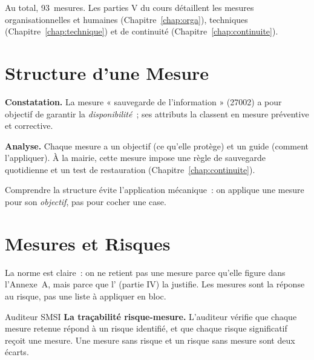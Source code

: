 Au total, 93~mesures. Les parties V du cours détaillent les mesures
organisationnelles et humaines (Chapitre~\ref{chap:orga}), techniques
(Chapitre~\ref{chap:technique}) et de continuité (Chapitre~\ref{chap:continuite}).

\section{Structure d'une Mesure}
\label{sec:c10-structure}

\begin{boxprocedure}
\textbf{Constatation.} La mesure « sauvegarde de l'information » (27002) a pour
objectif de garantir la \emph{disponibilité}~; ses attributs la classent en
mesure préventive et corrective.

\medskip
\textbf{Analyse.} Chaque mesure a un objectif (ce qu'elle protège) et un guide
(comment l'appliquer). À la mairie, cette mesure impose une règle de
sauvegarde quotidienne et un test de restauration (Chapitre~\ref{chap:continuite}).
\end{boxprocedure}

Comprendre la structure évite l'application mécanique~: on applique une mesure
pour son \emph{objectif}, pas pour cocher une case.

\section{Mesures et Risques}
\label{sec:c10-risques}

La norme est claire~: on ne retient pas une mesure parce qu'elle figure dans
l'Annexe~A, mais parce que l' (partie IV) la
justifie. Les mesures sont la réponse au risque, pas une liste à appliquer en
bloc.

\begin{boxmetier}{Auditeur SMSI}
\textbf{La traçabilité risque-mesure.} L'auditeur vérifie que chaque mesure
retenue répond à un risque identifié, et que chaque risque significatif reçoit
une mesure. Une mesure sans risque et un risque sans mesure sont deux écarts.
\end{boxmetier}

